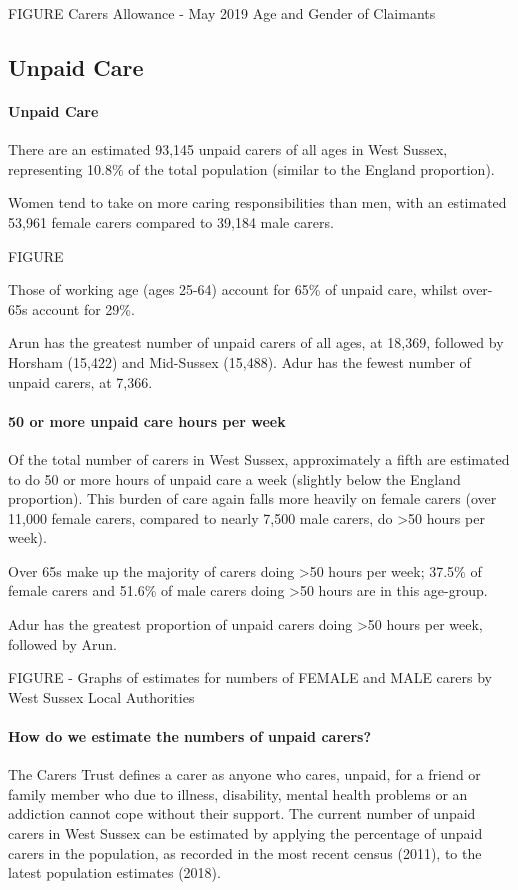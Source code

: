 FIGURE Carers Allowance - May 2019 Age and Gender of Claimants


\subsection{Unpaid Care}
\paragraph{Unpaid Care}There are an estimated 93,145 unpaid carers of all ages in West Sussex, representing 10.8\% of the total population (similar to the England proportion).

Women tend to take on more caring responsibilities than men, with an estimated 53,961 female carers compared to 39,184 male carers.

FIGURE

Those of working age (ages 25-64) account for 65\% of unpaid care, whilst over- 65s account for 29\%.

Arun has the greatest number of unpaid carers of all ages, at 18,369, followed by Horsham (15,422) and Mid-Sussex (15,488). Adur has the fewest number of unpaid carers, at 7,366.

\paragraph{50 or more unpaid care hours per week}Of the total number of carers in West Sussex, approximately a fifth are estimated to do 50 or more hours of unpaid care a week (slightly below the England proportion). This burden of care again falls more heavily on female carers (over 11,000 female carers, compared to nearly 7,500 male carers, do >50 hours per week).

Over 65s make up the majority of carers doing >50 hours per week; 37.5\% of female carers and 51.6\% of male carers doing >50 hours are in this age-group.

Adur has the greatest proportion of unpaid carers doing >50 hours per week, followed by Arun.

FIGURE - Graphs of estimates for numbers of FEMALE and MALE carers by West Sussex Local Authorities

\paragraph{How do we estimate the numbers of unpaid carers?} The Carers Trust defines a carer as anyone who cares, unpaid, for a friend or family member who due to illness, disability, mental health problems or an addiction cannot cope without their support. The current number of unpaid carers in West Sussex can be estimated by applying the percentage of unpaid carers in the population, as recorded in the most recent census (2011), to the latest population estimates (2018).

